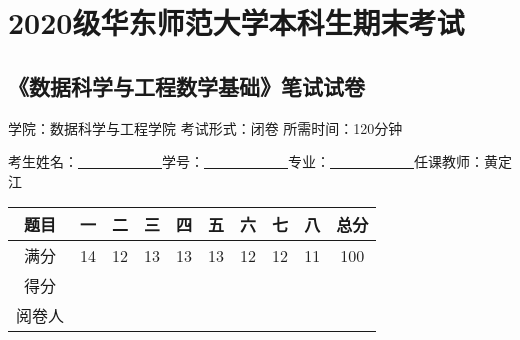 \documentclass[12pt,a4paper,openany,twoside]{ctexbook}
\begin{document}
\setcounter{chapter}{1}
\chapter*{2020级华东师范大学本科生期末考试}
\section*{《数据科学与工程数学基础》笔试试卷 }
\begin{center}
	学院：数据科学与工程学院 \qquad 考试形式：闭卷 \qquad 所需时间：120分钟
\end{center}
\begin{center}
	考生姓名：\underline{~~~~~~}\underline{~~~~~~}\qquad 学号：\underline{~~~~~~}\underline{~~~~~~}\qquad 专业：\underline{~~~~~~}\underline{~~~~~~}\qquad 任课教师：黄定江
\end{center}
{ \begin{center}
		\begin{tabular}{|c|c|c|c|c|c|c|c|c|c|}
			\hline 
			题目 & 一 & 二 & 三 & 四 & 五 & 六 & 七 & 八&总分 \\ 
			\hline 
			满分 & 14 & 12 & 13 & 13 & 13 & 12 & 12 & 11 & 100  \\ 
			\hline 
			得分 &  &  &  &  &  &  &  & &  \\ 
			\hline 
			阅卷人 &  &  &  &  &  &  &  & &  \\ 
			\hline 
		\end{tabular} 
		
\end{center}}
\end{document}
